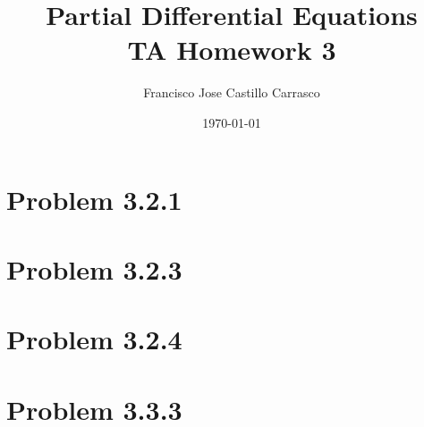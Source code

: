 




\title{Partial Differential Equations\\TA Homework 3}
\author{Francisco Jose Castillo Carrasco}
\date{\today}
\maketitle




\section*{Problem 3.2.1}


\section*{Problem 3.2.3}


\section*{Problem 3.2.4}


\section*{Problem 3.3.3}






